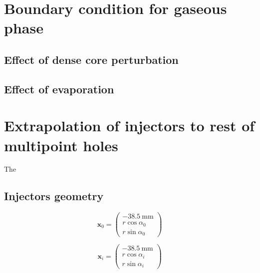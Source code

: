 



\section{Boundary condition for gaseous phase}
\label{sec:ch9_BIMER_BCs_for_gaseous_phase}

\subsection{Effect of dense core perturbation}

\subsection{Effect of evaporation}

\section{Extrapolation of injectors to rest of multipoint holes}

The 

\subsection{Injectors geometry}

\begin{equation}
\boldsymbol{x}_0 =  \begin{pmatrix} - 38.5 ~\mathrm{mm} \\ r \cos \alpha_0 \\ r \sin \alpha_0 \end{pmatrix}
\end{equation}

\begin{equation}
\boldsymbol{x}_i =  \begin{pmatrix} - 38.5 ~\mathrm{mm} \\ r \cos \alpha_i \\ r \sin \alpha_i \end{pmatrix}
\end{equation}


